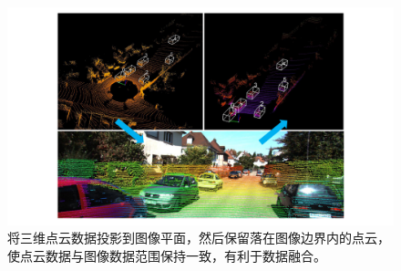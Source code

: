 \begin{figure}[t]
	\begin{center}
		\includegraphics[trim={5cm, 0.5cm, 5cm, 0.5cm}, clip, width=\textwidth]{imgs/projection.pdf}
	\end{center}
	\vspace{-0.8cm}
	\caption{将三维点云数据投影到图像平面，然后保留落在图像边界内的点云，使点云数据与图像数据范围保持一致，有利于数据融合。}
	\label{fig:projection}
\end{figure}
